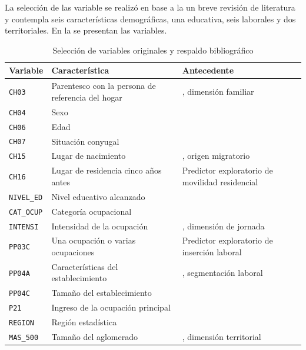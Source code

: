 La selección de las variable se realizó en base a la un breve revisión de literatura y contempla seis características demográficas, una educativa, seis laborales y dos territoriales. En la  se presentan las variables.
\begin{table}[H]
\centering
\caption{Selección de variables originales y respaldo bibliográfico}
\label{tab:variables_parte01}
\footnotesize
\begin{tabular}{p{1.8cm}p{5cm}p{7cm}}
\hline
\textbf{Variable} & \textbf{Característica} & \textbf{Antecedente} \\
\hline
\texttt{CH03} & Parentesco con la persona de referencia del hogar & \citet{casal2013}, dimensión familiar \\
\texttt{CH04} & Sexo & \citet{formichella2008,ludmer2020} \\
\texttt{CH06} & Edad & \citet{formichella2008,ludmer2020} \\
\texttt{CH07} & Situación conyugal & \citet{casal2013} \\
\texttt{CH15} & Lugar de nacimiento & \citet{ludmer2020}, origen migratorio \\
\texttt{CH16} & Lugar de residencia cinco años antes & Predictor exploratorio de movilidad residencial \\
\texttt{NIVEL\_ED} & Nivel educativo alcanzado & \citet{formichella2008,alvarez2025} \\
\texttt{CAT\_OCUP} & Categoría ocupacional & \citet{bertranou2013,casal2013} \\
\texttt{INTENSI} & Intensidad de la ocupación & \citet{alvarez2025}, dimensión de jornada \\
\texttt{PP03C} & Una ocupación o varias ocupaciones & Predictor exploratorio de inserción laboral \\
\texttt{PP04A} & Características del establecimiento & \citet{bertranou2013}, segmentación laboral \\
\texttt{PP04C} & Tamaño del establecimiento & \citet{cruces2018,ludmer2020} \\
\texttt{P21} & Ingreso de la ocupación principal & \citet{alvarez2025} \\
\texttt{REGION} & Región estadística & \citet{cristina2019} \\
\texttt{MAS\_500} & Tamaño del aglomerado & \citet{cristina2019}, dimensión territorial \\
\hline
\end{tabular}
\end{table}
